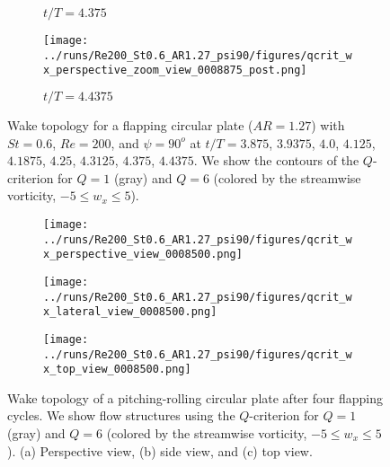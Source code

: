 \begin{figure}
\begin{subfigure}[b]{0.3\textwidth}
    \caption{$t / T = 4.375$}
  \end{subfigure}
  \hfill
  \begin{subfigure}[b]{0.3\textwidth}
    \centering
    \texttt{[image: ../runs/Re200\_St0.6\_AR1.27\_psi90/figures/qcrit\_wx\_perspective\_zoom\_view\_0008875\_post.png]}
    \caption{$t / T = 4.4375$}
  \end{subfigure}
  \caption{Wake topology for a flapping circular plate ($AR = 1.27$) with $St = 0.6$, $Re = 200$, and $\psi = 90^o$ at $t / T = 3.875$, $3.9375$, $4.0$, $4.125$, $4.1875$, $4.25$, $4.3125$, $4.375$, $4.4375$. We show the contours of the $Q$-criterion for $Q = 1$ (gray) and $Q = 6$ (colored by the streamwise vorticity, $-5 \leq w_x \leq 5$).}
  \label{fig:baseline_qcrit_perspective}
\end{figure}

\begin{figure}
  \centering
  \begin{minipage}{0.45\linewidth}
    \begin{subfigure}[t]{\linewidth}
      \texttt{[image: ../runs/Re200\_St0.6\_AR1.27\_psi90/figures/qcrit\_wx\_perspective\_view\_0008500.png]}
      \caption{}
    \end{subfigure}
  \end{minipage}
  \begin{minipage}{0.45\linewidth}
    \begin{subfigure}[t]{\linewidth}
      \texttt{[image: ../runs/Re200\_St0.6\_AR1.27\_psi90/figures/qcrit\_wx\_lateral\_view\_0008500.png]}
      \caption{}
    \end{subfigure}
    \vspace{1cm}
    \begin{subfigure}[b]{\linewidth}
      \texttt{[image: ../runs/Re200\_St0.6\_AR1.27\_psi90/figures/qcrit\_wx\_top\_view\_0008500.png]}
      \caption{}
    \end{subfigure}
  \end{minipage}
  \caption{Wake topology of a pitching-rolling circular plate after four flapping cycles. We show flow structures  using the $Q$-criterion for $Q = 1$ (gray) and $Q = 6$ (colored by the streamwise vorticity, $-5 \leq w_x \leq 5$). (a) Perspective view, (b) side view, and (c) top view.}
  \label{fig:baseline_wake_topology}
\end{figure}

